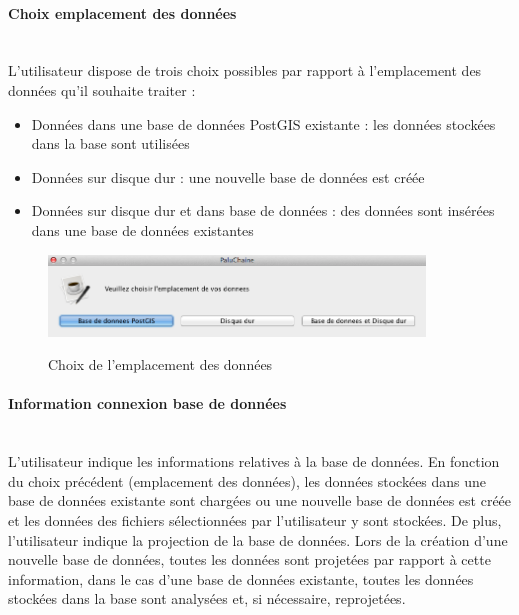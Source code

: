 \paragraph{Choix emplacement des données\\\\}

L'utilisateur dispose de trois choix possibles par rapport à l'emplacement des données qu'il souhaite traiter :

\begin{itemize}

\item Données dans une base de données PostGIS existante : les données stockées dans la base sont utilisées 
\item Données sur disque dur : une nouvelle base de données est créée
\item Données sur disque dur et dans base de données : des données sont insérées dans une base de données existantes
\end{itemize}


\begin{figure}[H]
\begin{center}
\includegraphics[width=10cm]{Logiciel1}\\
\caption{\label{Traitement1}Choix de l'emplacement des données}

\end{center}
\end{figure}

\paragraph{Information connexion base de données\\\\}

L'utilisateur indique les informations relatives à la base de données. En fonction du choix précédent (emplacement des données), les données stockées dans une base de données existante sont chargées ou une nouvelle base de données est créée et les données des fichiers sélectionnées par l'utilisateur y sont stockées. De plus, l'utilisateur indique la projection de la base de données. Lors de la création d'une nouvelle base de données, toutes les données sont projetées par rapport à cette information, dans le cas d'une base de données existante, toutes les données stockées dans la base sont analysées et, si nécessaire, reprojetées.

